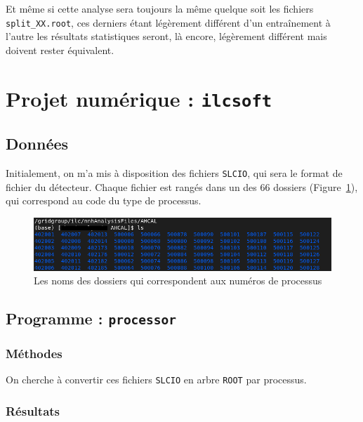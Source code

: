 \documentclass[10pt,a4paper]{report}
\newcommand{\qqs}{quelque soit\xspace}
\newcommand{\ROOT}{\texttt{ROOT}\xspace}
\newcommand{\SLCIO}{\texttt{SLCIO}\xspace}
\newcommand{\ilcsoft}{\texttt{ilcsoft}\xspace}
\newcommand{\processor}{\texttt{processor}\xspace}
\begin{document}


Et même si cette analyse sera toujours la même \qqs les fichiers \texttt{split\_XX.root}, ces derniers étant légèrement différent d'un entraînement à l'autre les résultats statistiques seront, là encore, légèrement différent mais doivent rester équivalent.

\section{Projet numérique : \ilcsoft}

\subsection{Données}
Initialement, on m'a mis à disposition des fichiers \SLCIO, qui sera le format de fichier du détecteur.
Chaque fichier est rangés dans un des 66 dossiers (Figure~\ref{listeProcessus}), qui correspond au code du type de processus.

\begin{figure}[h!]
	\includegraphics[width=\textwidth]{../img/listeProcessus.png} 
	\caption{Les noms des dossiers qui correspondent aux numéros de processus}
	\label{listeProcessus}
\end{figure}


\subsection{Programme : \processor}

\subsubsection{Méthodes}

On cherche à convertir ces fichiers \SLCIO en arbre \ROOT par processus.

\subsubsection{Résultats}
\end{document}
